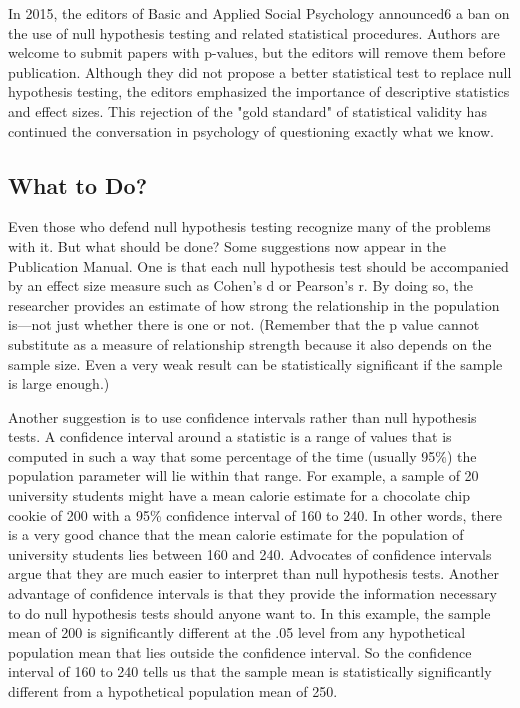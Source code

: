 In 2015, the editors of Basic and Applied Social Psychology announced6 a ban on the use of null hypothesis testing and related statistical procedures. Authors are welcome to submit papers with p-values, but the editors will remove them before publication. Although they did not propose a better statistical test to replace null hypothesis testing, the editors emphasized the importance of descriptive statistics and effect sizes. This rejection of the "gold standard" of statistical validity has continued the conversation in psychology of questioning exactly what we know.


\subsection{What to Do?}


Even those who defend null hypothesis testing recognize many of the problems with it. But what should be done? Some suggestions now appear in the Publication Manual. One is that each null hypothesis test should be accompanied by an effect size measure such as Cohen's d or Pearson's r. By doing so, the researcher provides an estimate of how strong the relationship in the population is---not just whether there is one or not. (Remember that the p value cannot substitute as a measure of relationship strength because it also depends on the sample size. Even a very weak result can be statistically significant if the sample is large enough.)


Another suggestion is to use confidence intervals rather than null hypothesis tests. A confidence interval around a statistic is a range of values that is computed in such a way that some percentage of the time (usually 95\%) the population parameter will lie within that range. For example, a sample of 20 university students might have a mean calorie estimate for a chocolate chip cookie of 200 with a 95\% confidence interval of 160 to 240. In other words, there is a very good chance that the mean calorie estimate for the population of university students lies between 160 and 240. Advocates of confidence intervals argue that they are much easier to interpret than null hypothesis tests. Another advantage of confidence intervals is that they provide the information necessary to do null hypothesis tests should anyone want to. In this example, the sample mean of 200 is significantly different at the .05 level from any hypothetical population mean that lies outside the confidence interval. So the confidence interval of 160 to 240 tells us that the sample mean is statistically significantly different from a hypothetical population mean of 250.


